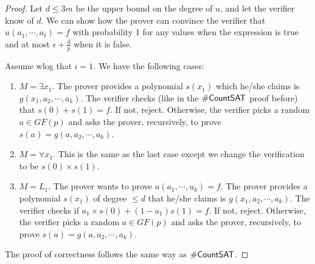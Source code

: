 \begin{proof}
\par Let $d \le 3m$ be the upper bound on the degree of $u$, and let the verifier know of $d$. We can show how the prover can convince the verifier that $u(a_1, \cdots, a_\ell) = f$ with probability 1 for any values when the expression is true and at most $\epsilon + \frac{d}{p}$ when it is false. 

\par Assume wlog that $i=1$. We have the following cases:
\begin{enumerate}
\item $M = \exists x_1$. The prover provides a polynomial $s(x_1)$ which he/she claims is $g(x_1, a_2, \cdots, a_k)$. The verifier checks (like in the ${\mathsf{\#CountSAT}}$ proof before) that $s(0) + s(1) = f$. If not, reject. Otherwise, the verifier picks a random $a \in GF(p)$ and asks the prover, recursively, to prove $s(a) = g(a, a_2, \cdots, a_k)$. 
\item $M = \forall x_1$. This is the same as the last case except we change the verification to be $s(0) \times s(1)$. 
\item $M = L_1$. The prover wants to prove $u(a_1, \cdots, u_k) = f$. The prover provides a polynomial $s(x_1)$ of degree $\le d$ that he/she claims is $g(x_1, a_2, \cdots, a_k)$. The verifier checks if $a_1 \times s(0) + (1-a_1) s(1) = f$. If not, reject. Otherwise, the verifier picks a random $a \in GF(p)$ and asks the prover, recursively, to prove $s(a) = g(a, a_2, \cdots, a_k)$. 
\end{enumerate}
The proof of correctness follows the same way as ${\mathsf{\#CountSAT}}$.
\end{proof}

